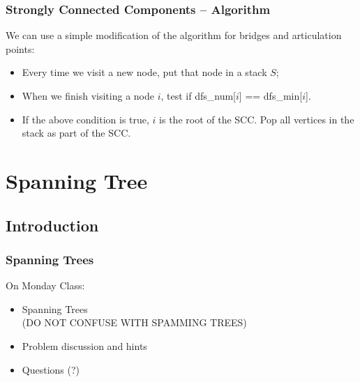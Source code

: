 \documentclass{beamer}
\begin{document}
\begin{frame}
  \frametitle{Strongly Connected Components -- Algorithm} 

  We can use a simple modification of the algorithm for bridges and
  articulation points:

  \begin{itemize}
    \item Every time we visit a new node, put that node in a stack $S$;
    \item When we finish visiting a node $i$, test if dfs\_num[$i$] == dfs\_min[$i$].
    \item If the above condition is true, $i$ is the root of the
      SCC. Pop all vertices in the stack as part of the SCC.
  \end{itemize}
\end{frame}

\section{Spanning Tree}
\subsection{Introduction}
\begin{frame}
  \frametitle{Spanning Trees}

  On Monday Class:

  \begin{itemize}
  \item Spanning Trees\\
    {\small (DO NOT CONFUSE WITH SPAMMING TREES)}
  \item Problem discussion and hints
  \item Questions (?)
  \end{itemize}
\end{frame}





\end{document}
